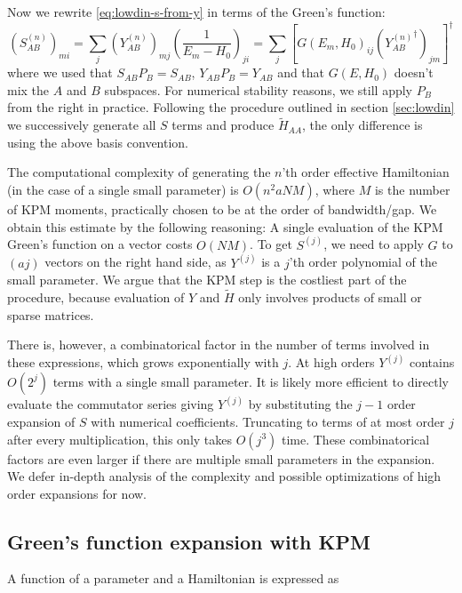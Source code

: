\documentclass[10pt, onecolumn, aps, prb, superscriptaddress, floatfix, showpacs, notitlepage]{revtex4-1}
\begin{document}
Now we rewrite \eqref{eq:lowdin-s-from-y} in terms of the Green's function:
\begin{equation}
\left(S^{(n)}_{AB}\right)_{mi} =\sum_j \left(Y^{(n)}_{AB}\right)_{mj} \left(\frac{1}{E_m - H_0}\right)_{ji} = \sum_j \left[G(E_m, H_0)_{ij} \left({Y^{(n)}_{AB}}^{\dagger} \right)_{jm}\right]^{\dagger}
\end{equation}
where we used that $S_{AB} P_B = S_{AB}$, $Y_{AB} P_B = Y_{AB}$ and that $G(E, H_0)$ doesn't mix the $A$ and $B$ subspaces.
For numerical stability reasons, we still apply $P_B$ from the right in practice.
Following the procedure outlined in section \ref{sec:lowdin} we successively generate all $S$ terms and produce $\tilde{H}_{AA}$, the only difference is using the above basis convention.

The computational complexity of generating the $n$'th order effective Hamiltonian (in the case of a single small parameter) is $O(n^2 a N M)$, where $M$ is the number of KPM moments, practically chosen to be at the order of bandwidth/gap.
We obtain this estimate by the following reasoning: A single evaluation of the KPM Green's function on a vector costs $O(NM)$. To get $S^{(j)}$, we need to apply $G$ to $(a j)$ vectors on the right hand side, as $Y^{(j)}$ is a $j$'th order polynomial of the small parameter.
We argue that the KPM step is the costliest part of the procedure, because evaluation of $Y$ and $\tilde{H}$ only involves products of small or sparse matrices.

There is, however, a combinatorical factor in the number of terms involved in these expressions, which grows exponentially with $j$.
At high orders $Y^{(j)}$ contains $O(2^j)$ terms with a single small parameter.
It is likely more efficient to directly evaluate the commutator series giving $Y^{(j)}$ by substituting the $j-1$ order expansion of $S$ with numerical coefficients.
Truncating to terms of at most order $j$ after every multiplication, this only takes $O(j^3)$ time.
These combinatorical factors are even larger if there are multiple small parameters in the expansion.
We defer in-depth analysis of the complexity and possible optimizations of high order expansions for now.

\subsection{Green's function expansion with KPM}

A function of a parameter and a Hamiltonian is expressed as
\end{document}
